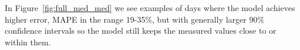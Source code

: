 In Figure~\ref{fig:full_med_med} we see examples of days where the model achieves higher error, MAPE in the range 19-35\%, but with generally larger 90\% confidence intervals so the model still keeps the measured values close to or within them.
\begin{figure}[ht!]
    \centering
    \qquad
    \qquad
    \qquad
    \qquad

\end{figure}
